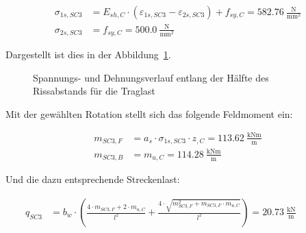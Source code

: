 \documentclass[
  11pt,
  letterpaper,
]{scrreprt}
\begin{document}
\[
\begin{aligned}
\sigma_{1 s , SC3}& = E_{sh , C} \cdot \left(\varepsilon_{1 s , SC3} - \varepsilon_{2 s , SC3}\right) + f_{sy , C} = 582.76 \ \frac{\mathrm{N}}{\mathrm{mm}^{2}} \\ 
\sigma_{2 s , SC3}& = f_{sy , C} = 500.0 \ \frac{\mathrm{N}}{\mathrm{mm}^{2}} \end{aligned}
\]

Dargestellt ist dies in der Abbildung~\ref{fig-jag_zustand_sc3}.

\begin{figure}[H]

\begin{minipage}{0.50\linewidth}



\end{minipage}%
%
\begin{minipage}{0.50\linewidth}



\end{minipage}%

\caption{\label{fig-jag_zustand_sc3}Spannungs- und Dehnungsverlauf
entlang der Hälfte des Rissabstands für die Traglast}

\end{figure}%

Mit der gewählten Rotation stellt sich das folgende Feldmoment ein:

\[
\begin{aligned}
m_{SC3 , F}& = a_{s} \cdot \sigma_{1 s , SC3} \cdot z_{, C} = 113.62 \ \frac{\mathrm{kNm}}{\mathrm{m}} \\ 
m_{SC3 , B}& = m_{u , C} = 114.28 \ \frac{\mathrm{kNm}}{\mathrm{m}} \end{aligned}
\]

Und die dazu entsprechende Streckenlast:

\[
\begin{aligned}
q_{SC3}& = b_{w} \cdot \left(\frac{4 \cdot m_{SC3 , F} + 2 \cdot m_{u , C}}{l^{2}} + \frac{4 \cdot \sqrt{m_{SC3 , F}^{2} + m_{SC3 , F} \cdot m_{u , C}}}{l^{2}}\right) = 20.73 \ \frac{\mathrm{kN}}{\mathrm{m}} \quad &  \quad &  
 \end{aligned}
\]
\end{document}
